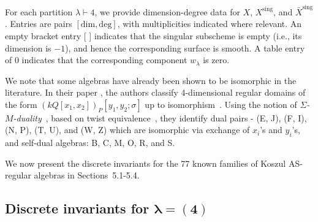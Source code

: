 \documentclass{amsart}
\begin{document}
For each partition $\lambda \vdash 4$, we provide dimension-degree data for \( X \), \( X^{\mathrm{sing}} \), and \( \bar{X}^{\mathrm{sing}} \). Entries are pairs \([\mathrm{dim}, \mathrm{deg}]\), with multiplicities indicated where relevant. An empty bracket entry [ ] indicates that the singular subscheme is empty (i.e., its dimension is $-1$), and hence the corresponding surface is smooth. A table entry of $0$ indicates that the corresponding component $w_{\lambda}$ is zero.

We note that some algebras have already been shown to be isomorphic in the literature. In their paper \cite{MR2529094}, the authors classify 4-dimensional regular domains of the form \( (kQ[x_1, x_2])_P[y_1, y_2; \sigma] \) up to isomorphism~\cite[Proposition~4.4]{MR2529094}. Using the notion of \emph{\(\Sigma\)-\(M\)-duality}~\cite[Definition~4.3]{MR2529094}, based on twist equivalence~\cite[Definition~3.3]{MR2529094}, they identify dual pairs - (E, J), (F, I), (N, P), (T, U), and (W, Z) which are isomorphic via exchange of \( x_i \)'s and \( y_i \)'s, and self-dual algebras: B, C, M, O, R, and S.

We now present the discrete invariants for the 77 known families of Koszul AS-regular algebras in Sections~5.1-5.4.


\clearpage


\subsection{Discrete invariants for \(\boldsymbol{\lambda = (4)}\)}
\noindent

\end{document}
